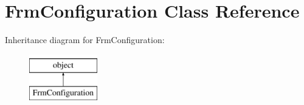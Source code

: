 \hypertarget{class_f_configuration_1_1_frm_configuration}{}\section{Frm\+Configuration Class Reference}
\label{class_f_configuration_1_1_frm_configuration}
Inheritance diagram for Frm\+Configuration\+:\begin{figure}[H]
\begin{center}
\leavevmode
\includegraphics[height=2.000000cm]{class_f_configuration_1_1_frm_configuration}
\end{center}
\end{figure}
